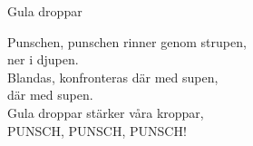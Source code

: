 \begin{song}{Gula droppar}
	
	
	
	Punschen, punschen rinner genom strupen,\\
	ner i djupen.\\
	Blandas, konfronteras där med supen,\\
	där med supen.\\
	Gula droppar stärker våra kroppar,\\
	PUNSCH, PUNSCH, PUNSCH!
	
\end{song}
